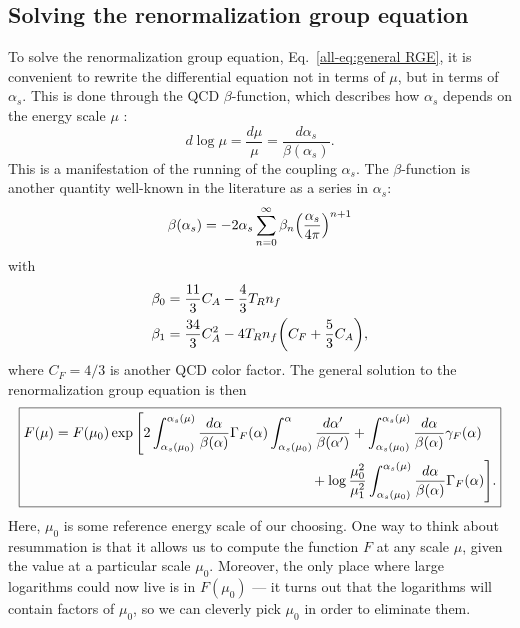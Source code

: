 \documentclass[../thesis.tex]{subfiles}
\begin{document}
\subsection{Solving the renormalization group equation}\label{all-sec:solving RGE}
	To solve the renormalization group equation, Eq.~\ref{all-eq:general RGE}, it is convenient to rewrite the differential equation not in terms of $\mu$, but in terms of $\alpha_s$. This is done through the QCD $\beta$-function, which describes how $\alpha_s$ depends on the energy scale $\mu$ \cite{frye_factorization_2016}:
	\begin{equation}\label{all-eq:beta function definition}
		d\log\mu = \frac{d\mu}{\mu} = \frac{d\alpha_s}{\beta(\alpha_s)}.
	\end{equation}
	This is a manifestation of the running of the coupling $\alpha_s$. The $\beta$-function is another quantity well-known in the literature as a series in $\alpha_s$:
	\begin{equation}
		\beta(\alpha_s) = -2\alpha_s \sum_{n = 0}^\infty \beta_n \qty(\frac{\alpha_s}{4\pi})^{n + 1}
	\end{equation}
	with \cite{frye_factorization_2016}
	\begin{equation}
	\begin{aligned}
		\beta_0 &= \frac{11}{3} C_A - \frac{4}{3}T_R n_f \\
		\beta_1 &= \frac{34}{3} C_A^2 - 4 T_R n_f \qty(C_F + \frac{5}{3} C_A),
	\end{aligned}
	\end{equation}
	where $C_F = 4/3$ is another QCD color factor. The general solution to the renormalization group equation is then \cite{frye_factorization_2016}
	\begin{equation}\label{all-eq:RGE general solution}
	\boxed{
	\begin{aligned}
		F(\mu) = F(\mu_0) \exp\Bigg[ 2 \int_{\alpha_s(\mu_0)}^{\alpha_s(\mu)} \frac{d\alpha}{\beta(\alpha)}\Gamma_F(\alpha) \int_{\alpha_s(\mu_0)}^\alpha \frac{d\alpha'}{\beta(\alpha')} &+ \int_{\alpha_s(\mu_0)}^{\alpha_s(\mu)} \frac{d\alpha}{\beta(\alpha)}\gamma_F(\alpha) \\
		&\hspace{-1cm}+ \log\frac{\mu_0^2}{\mu_1^2} \int_{\alpha_s(\mu_0)}^{\alpha_s(\mu)} \frac{d\alpha}{\beta(\alpha)}\Gamma_F(\alpha) \Bigg].
	\end{aligned}
	}
	\end{equation}
	Here, $\mu_0$ is some reference energy scale of our choosing. One way to think about resummation is that it allows us to compute the function $F$ at any scale $\mu$, given the value at a particular scale $\mu_0$. Moreover, the only place where large logarithms could now live is in $F(\mu_0)$ --- it turns out that the logarithms will contain factors of $\mu_0$, so we can cleverly pick $\mu_0$ in order to eliminate them.
\end{document}
